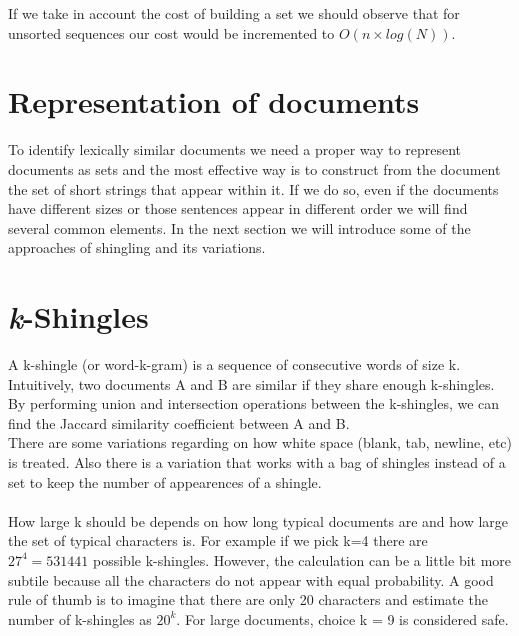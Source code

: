 \documentclass[12pt]{article}
\begin{document}
If we take in account the cost of building a set we should observe that for unsorted sequences our cost would be incremented to $O(n \times log(N))$.


\section{Representation of documents}

To identify lexically similar documents we need a proper way to represent documents as sets and the most effective way is to construct from the document the set of short strings that appear within it. If we do so, even if the documents have different sizes or those sentences appear in different order we will find several common elements. In the next section we will introduce some of the approaches of shingling and its variations.

\section{\textit{k}-Shingles} \label{kShingles}

A k-shingle (or word-k-gram) is a sequence of consecutive words of size k. Intuitively, two documents A and B are similar if they share enough k-shingles. By performing union and intersection operations between the k-shingles, we can find the Jaccard similarity coefficient between A and B. 
\\
There are some variations regarding on how white space (blank, tab, newline, etc) is treated. Also there is a variation that works with a bag of shingles instead of a set to keep the number of appearences of a shingle. \medskip \\
\\
How large k should be depends on how long typical documents are and how large the set of typical characters is. For example if we pick k=4 there are $27^4=531441 $ possible k-shingles. However, the calculation can be a little bit more subtile because all the characters do not appear with equal probability. A good rule of thumb is to imagine that there are only 20 characters and estimate the number of k-shingles as $20^k$. For large documents, choice k = 9 is considered safe. 
\end{document}
